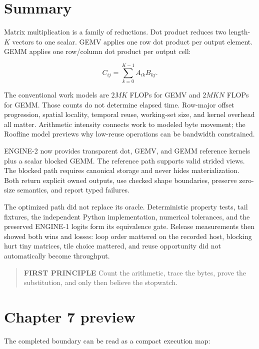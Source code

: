 \section{Summary}\label{summary-5}

Matrix multiplication is a family of reductions. Dot product reduces two
length-\(K\) vectors to one scalar. GEMV applies one row dot product per
output element. GEMM applies one row/column dot product per output cell:

\begin{equation}
C_{ij}=\sum_{k=0}^{K-1}A_{ik}B_{kj}.
\end{equation}

The conventional work models are \(2MK\) FLOPs for GEMV and \(2MKN\)
FLOPs for GEMM. Those counts do not determine elapsed time. Row-major
offset progression, spatial locality, temporal reuse, working-set size,
and kernel overhead all matter. Arithmetic intensity connects work to
modeled byte movement; the Roofline model previews why low-reuse
operations can be bandwidth constrained.

ENGINE-2 now provides transparent dot, GEMV, and GEMM reference kernels
plus a scalar blocked GEMM. The reference path supports valid strided
views. The blocked path requires canonical storage and never hides
materialization. Both return explicit owned outputs, use checked shape
boundaries, preserve zero-size semantics, and report typed failures.

The optimized path did not replace its oracle. Deterministic property
tests, tail fixtures, the independent Python implementation, numerical
tolerances, and the preserved ENGINE-1 logits form its equivalence gate.
Release measurements then showed both wins and losses: loop order
mattered on the recorded host, blocking hurt tiny matrices, tile choice
mattered, and reuse opportunity did not automatically become throughput.

\begin{quote}
\textbf{FIRST PRINCIPLE} Count the arithmetic, trace the bytes, prove
the substitution, and only then believe the stopwatch.
\end{quote}

\section{Chapter 7 preview}\label{chapter-7-preview}

The completed boundary can be read as a compact execution map:


